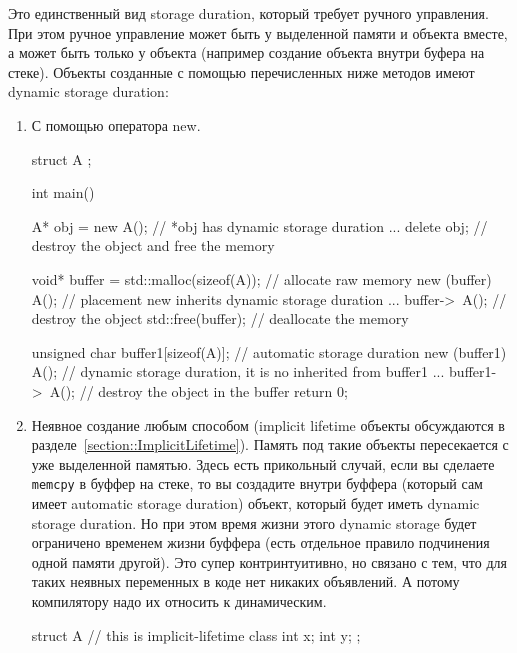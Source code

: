 \documentclass{article}
\begin{document}
Это единственный вид storage duration, который требует ручного управления.
При этом ручное управление может быть у выделенной памяти и объекта вместе, а может быть только у объекта (например создание объекта внутри буфера на стеке).
Объекты созданные с помощью перечисленных ниже методов имеют dynamic storage duration:
\begin{enumerate}
\item С помощью оператора new.
\begin{cppcode}[numbers = none]
struct A {};

int main() {
  A* obj = new A(); // *obj has dynamic storage duration
  ...
  delete obj;       // destroy the object and free the memory
  
  void* buffer = std::malloc(sizeof(A)); // allocate raw memory
  new (buffer) A();  // placement new inherits dynamic storage duration
  ...
  buffer->~A();      // destroy the object
  std::free(buffer); // deallocate the memory
  
  unsigned char buffer1[sizeof(A)]; // automatic storage duration
  new (buffer1) A();  // dynamic storage duration, it is no inherited from buffer1
  ...
  buffer1->~A();      // destroy the object in the buffer
  return 0;
}
\end{cppcode}

\item Неявное создание любым способом (implicit lifetime объекты обсуждаются в разделе~\ref{section::ImplicitLifetime}).
Память под такие объекты пересекается с уже выделенной памятью.
Здесь есть прикольный случай, если вы сделаете \verb"memcpy" в буффер на стеке, то вы создадите внутри буффера (который сам имеет automatic storage duration) объект, который будет иметь dynamic storage duration.
Но при этом время жизни этого dynamic storage будет ограничено временем жизни буффера (есть отдельное правило подчинения одной памяти другой).
Это супер контринтуитивно, но связано с тем, что для таких неявных переменных в коде нет никаких объявлений.
А потому компилятору надо их относить к динамическим.
\begin{cppcode}
struct A { // this is implicit-lifetime class
  int x;
  int y;
};


\end{cppcode}
\end{enumerate}
\end{document}
